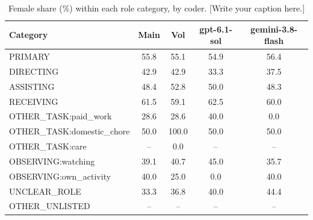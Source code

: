 \begin{table}[t]
\centering
\scriptsize
\begin{tabular}{@{}lcccc@{}}
\toprule
Category & \textbf{Main} & \textbf{Vol} & \textbf{gpt-6.1-sol} & \textbf{gemini-3.8-flash} \\
\midrule
PRIMARY & 55.8 & 55.1 & 54.9 & 56.4 \\
DIRECTING & 42.9 & 42.9 & 33.3 & 37.5 \\
ASSISTING & 48.4 & 52.8 & 50.0 & 48.3 \\
RECEIVING & 61.5 & 59.1 & 62.5 & 60.0 \\
OTHER\_TASK:paid\_work & 28.6 & 28.6 & 40.0 & 0.0 \\
OTHER\_TASK:domestic\_chore & 50.0 & 100.0 & 50.0 & 50.0 \\
OTHER\_TASK:care & -- & 0.0 & -- & -- \\
OBSERVING:watching & 39.1 & 40.7 & 45.0 & 35.7 \\
OBSERVING:own\_activity & 40.0 & 25.0 & 0.0 & 40.0 \\
UNCLEAR\_ROLE & 33.3 & 36.8 & 40.0 & 44.4 \\
OTHER\_UNLISTED & -- & -- & -- & -- \\
\bottomrule
\end{tabular}
\caption{Female share (\%) within each role category, by coder. [Write your caption here.]}
\label{tab:category-shares}
\end{table}
